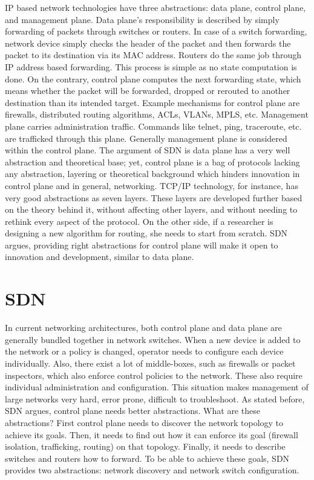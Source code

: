 \documentclass[12pt,journal,compsoc]{IEEEtran}
\begin{document}
 IP based network technologies have three abstractions: data plane, control plane, and management plane. Data plane's responsibility is described by simply forwarding of packets through switches or routers. In case of a switch forwarding, network device simply checks the header of the packet and then forwards the packet to its destination via its MAC address. Routers do the same job through IP address based forwarding. This process is simple as no state computation is done. On the contrary, control plane computes the next forwarding state, which means whether the packet will be forwarded, dropped or rerouted to another destination than its intended target. Example mechanisms for control plane are firewalls, distributed routing algorithms, ACLs, VLANs, MPLS, etc. Management plane carries administration traffic. Commands like telnet, ping, traceroute, etc. are trafficked through this plane. Generally management plane is considered within the control plane. The argument of SDN is data plane has a very well abstraction and theoretical base; yet, control plane is a bag of protocols lacking any abstraction, layering or theoretical background which hinders innovation in control plane and in general, networking. TCP/IP technology, for instance, has very good abstractions as seven layers. These layers are developed further based on the theory behind it, without affecting other layers, and without needing to rethink every aspect of the protocol. On the other side, if a researcher is designing a new algorithm for routing, she needs to start from scratch. SDN argues, providing right abstractions for control plane will make it open to innovation and development, similar to data plane. 

\section{SDN}
In current networking architectures, both control plane and data plane are generally 
bundled together in network switches. When a new device is added to the network 
or a policy is changed, operator needs to configure each device individually. 
Also, there exist a lot of middle-boxes, such as firewalls or packet inspectors, 
which also enforce control policies to the network. These also require individual 
administration and configuration. This situation makes management of large 
networks very hard, error prone, difficult to troubleshoot. As stated before, 
SDN argues, control plane needs better abstractions. What are these 
abstractions? First control plane needs to discover the network topology 
to achieve its goals. Then, it needs to find out how it can enforce its 
goal (firewall isolation, trafficking, routing) on that topology. 
Finally, it needs to describe switches and routers how to forward. To 
be able to achieve these goals, SDN provides two abstractions: 
network discovery and network switch configuration.
\end{document}
